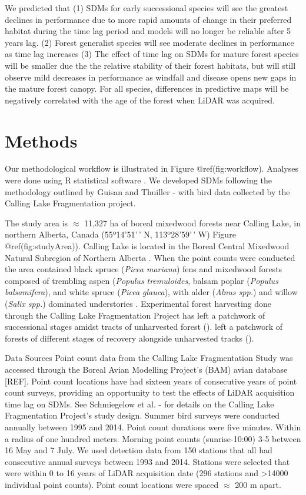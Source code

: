 \documentclass[manuscript, 3p,
authoryear]{elsarticle} %
\begin{document}
We predicted that (1) SDMs for early successional species will see the
greatest declines in performance due to more rapid amounts of change in
their preferred habitat during the time lag period and models will no
longer be reliable after 5 years lag. (2) Forest generalist species will
see moderate declines in performance as time lag increases (3) The
effect of time lag on SDMs for mature forest species will be smaller due
the the relative stability of their forest habitats, but will still
observe mild decreases in performance as windfall and disease opens new
gaps in the mature forest canopy. For all species, differences in
predictive maps will be negatively correlated with the age of the forest
when LiDAR was acquired.

\hypertarget{methods}{%
\section{Methods}\label{methods}}

Our methodological workflow is illustrated in Figure @ref(fig:workflow).
Analyses were done using R statistical software \citep{R-base}. We
developed SDMs following the methodology outlined by Guisan and Thuiller
-\citet{Guisan2005} with bird data collected by the Calling Lake
Fragmentation project.

The study area is \(\approx\) 11,327 ha of boreal mixedwood forests near
Calling Lake, in northern Alberta, Canada (55º14'51'\,' N, 113º28'59'\,'
W) Figure @ref(fig:studyArea)). Calling Lake is located in the Boreal
Central Mixedwood Natural Subregion of Northern Alberta
\citep{Downing2006}. When the point counts were conducted the area
contained black spruce (\emph{Picea mariana}) fens and mixedwood forests
composed of trembling aspen (\emph{Populus tremuloides}, balsam poplar
(\emph{Populus balsamifera}), and white spruce (\emph{Picea glauca}),
with alder (\emph{Alnus spp.}) and willow (\emph{Salix spp.}) dominated
understories \citep{Schmiegelow1997}. Experimental forest harvesting
done through the Calling Lake Fragmentation Project has left a patchwork
of successional stages amidst tracts of unharvested forest
(\citet{Schmiegelow1997}). left a patchwork of forests of different
stages of recovery alongside unharvested tracks
(\citet{Schmiegelow1997}).

Data Sources Point count data from the Calling Lake Fragmentation Study
was accessed through the Boreal Avian Modelling Project's (BAM) avian
database {[}REF{]}. Point count locations have had sixteen years of
consecutive years of point count surveys, providing an opportunity to
test the effects of LiDAR acquisition time lag on SDMs. See Schmiegelow
et al. -\citet{Schmiegelow1997} for details on the Calling Lake
Fragmentation Project's study design. Summer bird surveys were conducted
annually between 1995 and 2014. Point count durations were five minutes.
Within a radius of one hundred meters. Morning point counts
(sunrise-10:00) 3-5 between 16 May and 7 July. We used detection data
from 150 stations that all had consecutive annual surveys between 1993
and 2014. Stations were selected that were within 0 to 16 years of LiDAR
acquisition date (296 stations and \textgreater14000 individual point
counts). Point count locations were spaced \(\approx\) 200 m apart.
\end{document}
